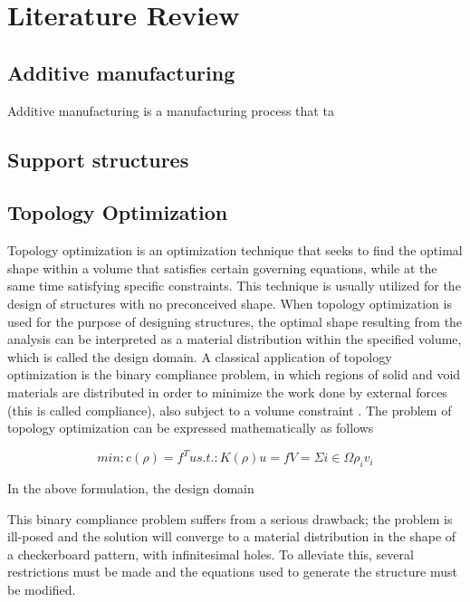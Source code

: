 \documentclass[../main.tex]{subfiles}
\begin{document}
	
\chapter{Literature Review}

\section{Additive manufacturing}

Additive manufacturing is a manufacturing process that ta

\section{Support structures}

\section{Topology Optimization}

Topology optimization is an optimization technique that seeks to find the optimal shape within a volume that satisfies certain governing equations, while at the same time satisfying specific constraints. This technique is usually utilized for the design of structures with no preconceived shape. When topology optimization is used for the purpose of designing structures, the optimal shape resulting from the analysis can be interpreted as a material distribution within the specified volume, which is called the design domain. A classical application of topology optimization is the binary compliance problem, in which regions of solid and void materials are distributed in order to minimize the work done by external forces (this is called compliance), also subject to a volume constraint \cite{liu_efficient_2014}. The problem of topology optimization can be expressed mathematically as follows \cite{lazarov_filters_2011}

\begin{equation}
  \label{eq:topopt_eq}
  min: c(\rho) = f^T u 
  s.t. : K(\rho)u = f 
  V = \Sigma i \in \Omega \rho_i v_i
\end{equation}

In the above formulation, the design domain 

This binary compliance problem suffers from a serious drawback; the problem is ill-posed and the solution will converge to a material distribution in the shape of a checkerboard pattern, with infinitesimal holes. To alleviate this, several restrictions must be made  and the equations used to generate the structure must be modified. 
\end{document}
